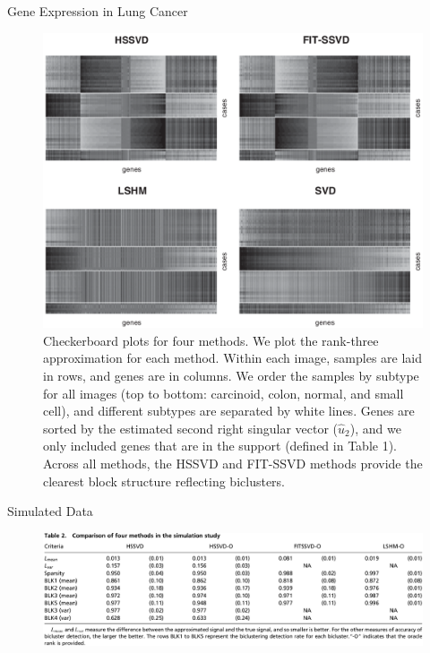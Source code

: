 \documentclass{beamer}
\begin{document}
\begin{frame}{Gene Expression in Lung Cancer}
  \begin{figure}
    \includegraphics[height=.6\textheight,keepaspectratio]{figures/fig4.png}
    \caption{Checkerboard plots for four methods. We plot the rank-three
      approximation for each method. Within each image, samples are laid in
      rows, and genes are in columns. We order the samples by subtype for all
      images (top to bottom: carcinoid, colon, normal, and small cell), and
      different subtypes are separated by white lines. Genes are sorted by the
      estimated second right singular vector ($\hat{u}_2$), and we only
      included genes that are in the support (defined in Table 1). Across all
      methods, the HSSVD and FIT-SSVD methods provide the clearest block
      structure reflecting biclusters.}
  \end{figure}
\end{frame}

\begin{frame}{Simulated Data}
  \begin{figure}
  \includegraphics[width=\linewidth,keepaspectratio]{figures/table2.png}
  \end{figure}
\end{frame}
\end{document}
